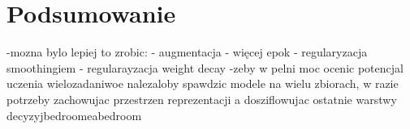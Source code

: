 \newpage %
\section{Podsumowanie}

-mozna bylo lepiej to zrobic:
    - augmentacja
    - więcej epok
    - regularyzacja smoothingiem
    - regularayzacja weight decay
-zeby w pelni moc ocenic potencjal uczenia wielozadaniwoe nalezaloby spawdzic modele na wielu zbiorach, w razie potrzeby zachowujac przestrzen reprezentacji a dosziflowujac ostatnie warstwy decyzyjbedroomeabedroom